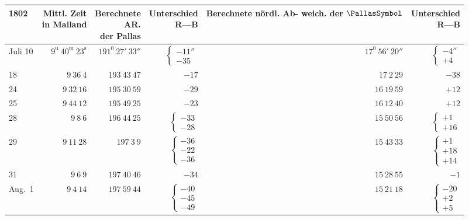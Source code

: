 \begin{center}
\begingroup\footnotesize\setlength{\tabcolsep}{2pt}
\begin{tabular}{l|r|r|r|r|r}
1802&\shortstack{Mittl. Zeit\\in Mailand}&\shortstack{Berechnete\\AR.\\der Pallas}&\shortstack{Unterschied\\R—B}&\shortstack{Berechnete\\nördl. Ab-\\weich. der $\PallasSymbol$}&\shortstack{Unterschied\\R—B}\\\hline
Juli 10&$9^{\mathrm u}\ 40^{\mathrm m}\ 23^{\mathrm s}$&$191^0\ 27'\ 33''$&$\left\{\begin{array}{r}-11''\\-35\end{array}\right.$&$17^0\ 56'\ 20''$&$\left\{\begin{array}{r}-4''\\+4\end{array}\right.$\\
18&$9\ 36\ 4$&$193\ 43\ 47$&$-17$&$17\ 2\ 29$&$-38$\\
24&$9\ 32\ 16$&$195\ 30\ 59$&$-29$&$16\ 19\ 59$&$+12$\\
25&$9\ 44\ 12$&$195\ 49\ 25$&$-23$&$16\ 12\ 40$&$+12$\\
28&$9\ 8\ 6$&$196\ 44\ 25$&$\left\{\begin{array}{r}-33\\-28\end{array}\right.$&$15\ 50\ 56$&$\left\{\begin{array}{r}+1\\+16\end{array}\right.$\\
29&$9\ 11\ 28$&$197\ 3\ 9$&$\left\{\begin{array}{r}-36\\-22\\-36\end{array}\right.$&$15\ 43\ 33$&$\left\{\begin{array}{r}+1\\+18\\+14\end{array}\right.$\\
31&$9\ 6\ 9$&$197\ 40\ 46$&$-34$&$15\ 28\ 55$&$-1$\\
Aug.\ 1&$9\ 4\ 14$&$197\ 59\ 44$&$\left\{\begin{array}{r}-40\\-45\\-49\end{array}\right.$&$15\ 21\ 18$&$\left\{\begin{array}{r}-20\\+2\\+5\end{array}\right.$\\

\end{tabular}
\end{center}
